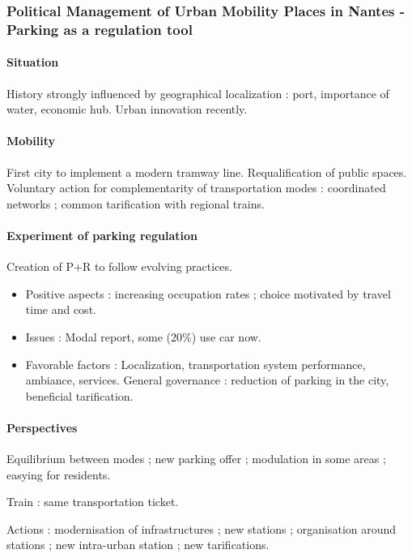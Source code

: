 \subsubsection{Political Management of Urban Mobility Places in Nantes - Parking as a regulation tool}

\paragraph{Situation}

History strongly influenced by geographical localization : port, importance of water, economic hub. Urban innovation recently.

\paragraph{Mobility}

First city to implement a modern tramway line. Requalification of public spaces. Voluntary action for complementarity of transportation modes : coordinated networks ; common tarification with regional trains.

\paragraph{Experiment of parking regulation}

Creation of P+R to follow evolving practices. 

\begin{itemize}
\item Positive aspects : increasing occupation rates ; choice motivated by travel time and cost.
\item Issues : Modal report, some (20\%) use car now.
\item Favorable factors : Localization, transportation system performance, ambiance, services. General governance : reduction of parking in the city, beneficial tarification.
\end{itemize}

\paragraph{Perspectives}

Equilibrium between modes ; new parking offer ; modulation in some areas ; easying for residents.

Train : same transportation ticket.

Actions : modernisation of infrastructures ; new stations ; organisation around stations ; new intra-urban station ; new tarifications.

